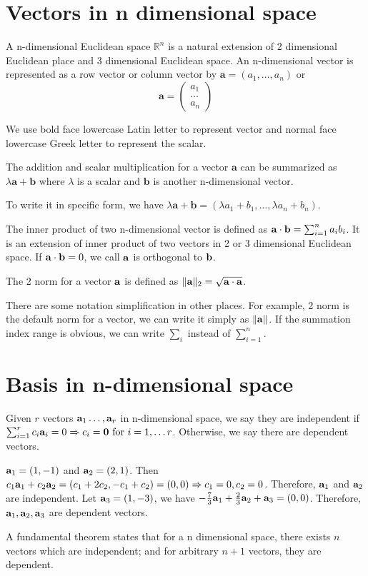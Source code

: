 \section{Vectors in n dimensional space}
A n-dimensional Euclidean space $\mathbb{R}^n$ is a natural extension of 2 dimensional Euclidean place and 3 dimensional Euclidean space. An n-dimensional vector is represented as a row vector or column vector by $\mathbf{a} = (a_1, \dots, a_n)$ or 
$$
\mathbf{a} = \begin{pmatrix} a_1 \\ \dots \\ a_n \end{pmatrix}
$$

We use bold face lowercase Latin letter to represent vector and normal face lowercase Greek letter to represent the scalar.

The addition and scalar multiplication for a vector $\mathbf{a}$ can be summarized as $\lambda \mathbf{a} + \mathbf{b}$ where $\lambda$ is a scalar and $\mathbf{b}$ is another n-dimensional vector.

To write it in specific form, we have $\lambda \mathbf{a} + \mathbf{b} = (\lambda a_1 + b_1, \dots, \lambda a_n + b_n)$.

The inner product of two n-dimensional vector is defined as $\mathbf{a} \cdot \mathbf{b} = \sum_{i=1}^n a_i b_i$. It is an extension of inner product of two vectors in 2 or 3 dimensional Euclidean space. If $\mathbf{a} \cdot \mathbf{b} = 0 $, we call $\mathbf{a}$ is orthogonal to $\mathbf{b}$.

The 2 norm for a vector $\mathbf{a}$ is defined as $\lVert\mathbf{a}\rVert_2 = \sqrt{\mathbf{a}\cdot \mathbf{a}}$.

There are some notation simplification in other places. For example, 2 norm is the default norm for a vector, we can write it simply as $\lVert\mathbf{a}\rVert$. If the summation index range is obvious, we can write $\sum_{i}$ instead of $\sum_{i=1}^n$.

\section{Basis in n-dimensional space}
Given $r$ vectors $\mathbf{a}_1 \dots, \mathbf{a}_r$ in n-dimensional space, we say they are independent if $ \sum_{i=1}^r c_i \mathbf{a}_i = 0 \Rightarrow c_i = \mathbf{0} \textrm{ for } i=1,\dots r$.
Otherwise, we say there are dependent vectors.
\begin{example}
$\mathbf{a}_1 = (1, -1)$ and $\mathbf{a}_2 = (2, 1)$. Then $c_1 \mathbf{a}_1 + c_2 \mathbf{a}_2 = (c_1 + 2 c_2, -c_1 + c_2 ) = (0,0) \Rightarrow c_1 = 0, c_2 = 0$. Therefore, $\mathbf{a}_1$ and $\mathbf{a}_2$ are independent. Let $\mathbf{a}_3 = (1, -3)$, we have $-\frac{7}{3} \mathbf{a}_1 + \frac{2}{3} \mathbf{a}_2 + \mathbf{a}_3 = (0,0)$. Therefore, $\mathbf{a}_1, \mathbf{a}_2, \mathbf{a}_3$ are dependent vectors.
\end{example}
A fundamental theorem states that for a n dimensional space, there exists $n$ vectors which are independent; and for arbitrary $n+1$ vectors, they are dependent.

